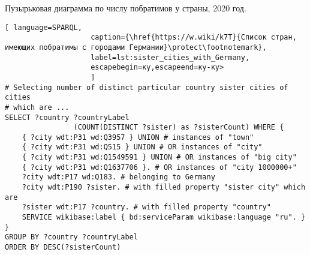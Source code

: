 \begin{marginfigure}[0.0cm]
{
\setlength{\fboxsep}{0pt}%
\setlength{\fboxrule}{1pt}%
%
}
  \caption{Пузырьковая диаграмма по числу побратимов у страны, 2020 год.}%
  \label{fig:Bubble_countries_sister_cities}%
\end{marginfigure}

\begin{lstlisting}[ language=SPARQL, 
                    caption={\href{https://w.wiki/k7T}{Список стран, имеющих побратимы с городами Германии}\protect\footnotemark},
                    label=lst:sister_cities_with_Germany, 
                    escapebegin=ку,escapeend=ку-ку>
                    ]
# Selecting number of distinct particular country sister cities of cities 
# which are ...
SELECT ?country ?countryLabel 
				(COUNT(DISTINCT ?sister) as ?sisterCount) WHERE {                                                          
	{ ?city wdt:P31 wd:Q3957 } UNION # instances of "town"
	{ ?city wdt:P31 wd:Q515 } UNION # OR instances of "city"
	{ ?city wdt:P31 wd:Q1549591 } UNION # OR instances of "big city"      
	{ ?city wdt:P31 wd:Q1637706 }. # OR instances of "city 1000000+"
	?city wdt:P17 wd:Q183. # belonging to Germany  
	?city wdt:P190 ?sister. # with filled property "sister city" which are
	?sister wdt:P17 ?country. # with filled property "country"
	SERVICE wikibase:label { bd:serviceParam wikibase:language "ru". }
}
GROUP BY ?country ?countryLabel
ORDER BY DESC(?sisterCount)\end{lstlisting}

